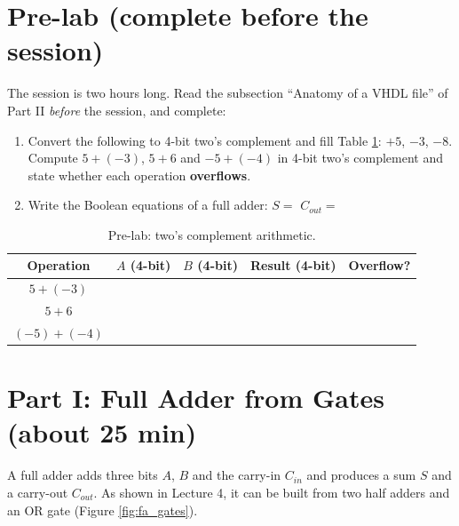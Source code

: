 \documentclass{article}
\begin{document}
\section*{Pre-lab (complete before the session)}
The session is two hours long. Read the subsection ``Anatomy of a VHDL file'' of Part II \emph{before} the session, and complete:
\begin{enumerate}
    \item Convert the following to 4-bit two's complement and fill Table \ref{tab:prelab}: $+5$, $-3$, $-8$. Compute $5 + (-3)$, $5+6$ and $-5 + (-4)$ in 4-bit two's complement and state whether each operation \textbf{overflows}.
    \item Write the Boolean equations of a full adder: $S = $ \underline{\hspace{3cm}} \quad $C_{out} = $ \underline{\hspace{4cm}}
\end{enumerate}

\begin{table}[H]
    \centering
    \begin{tabular}{|c|c|c|c|c|}
        \hline
        \textbf{Operation} & \textbf{$A$ (4-bit)} & \textbf{$B$ (4-bit)} & \textbf{Result (4-bit)} & \textbf{Overflow?} \\
        \hline
        $5 + (-3)$ & & & & \\
        \hline
        $5 + 6$ & & & & \\
        \hline
        $(-5) + (-4)$ & & & & \\
        \hline
    \end{tabular}
    \caption{Pre-lab: two's complement arithmetic.}
    \label{tab:prelab}
\end{table}

\section*{Part I: Full Adder from Gates (about 25 min)}

A full adder adds three bits $A$, $B$ and the carry-in $C_{in}$ and produces a sum $S$ and a carry-out $C_{out}$. As shown in Lecture 4, it can be built from two half adders and an OR gate (Figure \ref{fig:fa_gates}).
\end{document}
